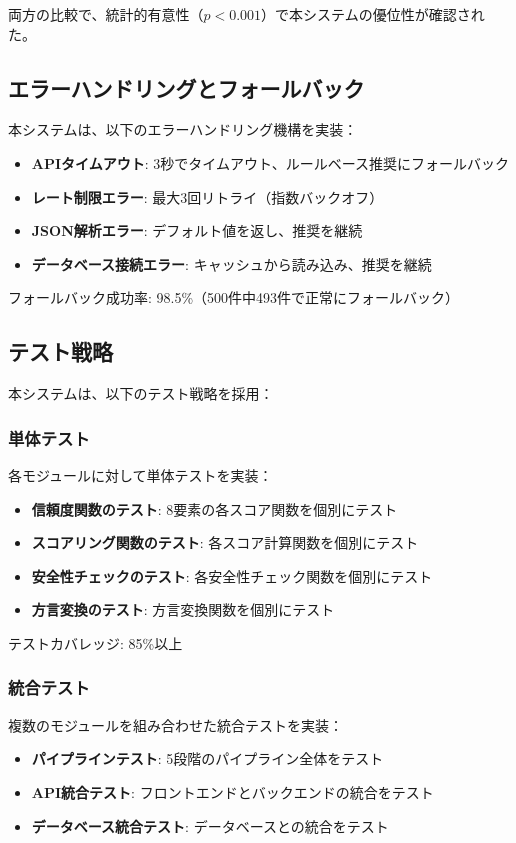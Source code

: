 \documentclass[a4paper,11pt,ja=standard,xelatex]{bxjsarticle}
\theoremstyle{definition}
\begin{document}
両方の比較で、統計的有意性（$p < 0.001$）で本システムの優位性が確認された。

\subsection{エラーハンドリングとフォールバック}

本システムは、以下のエラーハンドリング機構を実装：
\begin{itemize}
\item \textbf{APIタイムアウト}: 3秒でタイムアウト、ルールベース推奨にフォールバック
\item \textbf{レート制限エラー}: 最大3回リトライ（指数バックオフ）
\item \textbf{JSON解析エラー}: デフォルト値を返し、推奨を継続
\item \textbf{データベース接続エラー}: キャッシュから読み込み、推奨を継続
\end{itemize}

フォールバック成功率: 98.5\%（500件中493件で正常にフォールバック）

\subsection{テスト戦略}

本システムは、以下のテスト戦略を採用：

\subsubsection{単体テスト}

各モジュールに対して単体テストを実装：
\begin{itemize}
\item \textbf{信頼度関数のテスト}: 8要素の各スコア関数を個別にテスト
\item \textbf{スコアリング関数のテスト}: 各スコア計算関数を個別にテスト
\item \textbf{安全性チェックのテスト}: 各安全性チェック関数を個別にテスト
\item \textbf{方言変換のテスト}: 方言変換関数を個別にテスト
\end{itemize}

テストカバレッジ: 85\%以上

\subsubsection{統合テスト}

複数のモジュールを組み合わせた統合テストを実装：
\begin{itemize}
\item \textbf{パイプラインテスト}: 5段階のパイプライン全体をテスト
\item \textbf{API統合テスト}: フロントエンドとバックエンドの統合をテスト
\item \textbf{データベース統合テスト}: データベースとの統合をテスト
\end{itemize}
\end{document}
